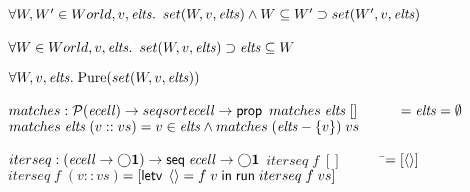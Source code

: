 \begin{specification}
$\forall W, W' \in World, v, \mathit{elts}.$ \nextline
\>$set(W,v,\mathit{elts}) \land W \subseteq W' \supset set(W',v, \mathit{elts})$\nextline[1em]

$\forall W \in World, v, \mathit{elts}.$ \nextline
\>$set(W, v, \mathit{elts}) \supset \mathit{elts} \subseteq W$ \nextline[1em]

$\forall W, v, \mathit{elts}.\; \mathrm{Pure}(set(W,v,\mathit{elts}))$ \nextline[1em]
  
$matches : \mathcal{P}(\mathit{ecell}) \to seqsort{\mathit{ecell}} \to \mathsf{prop}$ \nextline
$matches\;\mathit{elts}\;[] \qquad\;\;\; = \mathit{elts} = \emptyset$ \nextline
$matches\;\mathit{elts}\;(v :: vs) = v \in \mathit{elts} \land matches\;(\mathit{elts} - \{{v}\})\;vs$\nextline[1em]

$iterseq : (\mathit{ecell} \to \bigcirc{\mathbf{1}}) \to \mathsf{seq}\;{\mathit{ecell}} \to \bigcirc{\mathbf{1}}$ \nextline
$iterseq\; f\; [] \qquad\;\;\;\;$\=$= [\left<\right>]$ \nextline
$iterseq\; f\; (v :: vs)$\>$= [\mathsf{letv}\;\left<\right> = f\;v\;\mathsf{in}\;\mathsf{run}\;iterseq\;f\;vs]$
\end{specification}



